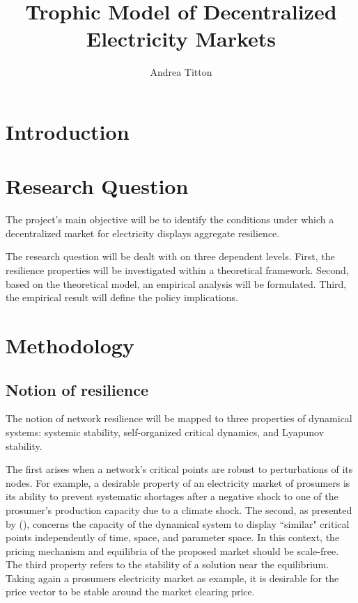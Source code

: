 \documentclass[american]{scrartcl}
\title{
        Trophic Model of Decentralized Electricity Markets
    }
\author{Andrea Titton}
\begin{document}
\nocite{*}
\maketitle

\section{Introduction}

\section{Research Question}

The project's main objective will be to identify the conditions under which a decentralized market for electricity displays aggregate resilience.

The research question will be dealt with on three dependent levels. First, the resilience properties will be investigated within a theoretical framework. Second, based on the theoretical model, an empirical analysis will be formulated. Third, the empirical result will define the policy implications.

\section{Methodology}

\subsection{Notion of resilience}

The notion of network resilience will be mapped to three properties of dynamical systems: systemic stability, self-organized critical dynamics, and Lyapunov stability.

The first arises when a network's critical points are robust to perturbations of its nodes. For example, a desirable property of an electricity market of prosumers is its ability to prevent systematic shortages after a negative shock to one of the prosumer's production capacity due to a climate shock. The second, as presented by \citeauthor{Bak1995} (\citeyear{Bak1995}), concerns the capacity of the dynamical system to display ``similar" critical points independently of time, space, and parameter space. In this context, the pricing mechanism and equilibria of the proposed market should be scale-free. The third property refers to the stability of a solution near the equilibrium. Taking again a prosumers electricity market as example, it is desirable for the price vector to be stable around the market clearing price.
\end{document}
